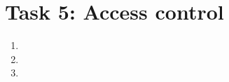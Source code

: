 \section*{Task 5: Access control}
\begin{enumerate}
\item %
\item %
\item \highergradesonly
\end{enumerate}
